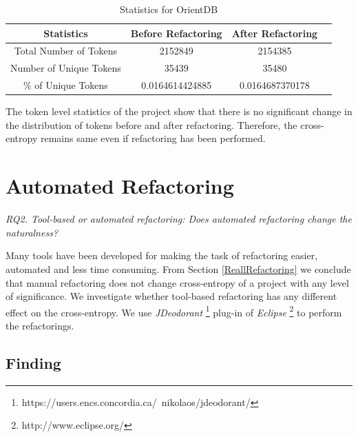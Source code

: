 \documentclass[conference]{IEEEtran}
\begin{document}
\begin{table}[t]
\centering
\caption{Statistics for OrientDB}
\label{SuammaryOrientDB}
 \begin{tabular}{||c c c c||} 
 \hline
 Statistics & Before Refactoring & After Refactoring \\ [0.5ex] 
 \hline\hline
 Total Number of Tokens & 2152849 & 2154385 \\ 
 \hline
   Number of Unique Tokens & 35439 & 35480 \\
 \hline
	\% of Unique Tokens  & 0.0164614424885 & 0.0164687370178  \\ [1ex]  
 \hline
\end{tabular}
\end{table}

The token level statistics of the project show that there is no significant change in the distribution of tokens before and after refactoring. Therefore, the cross-entropy remains same even if refactoring has been performed.

\noindent{}

\section{Automated Refactoring} \label{ToolRefactoring}
\textit{RQ2. Tool-based or automated refactoring: Does automated refactoring change the naturalness?}

Many tools have been developed for making the task of refactoring easier, automated and less time consuming. From Section \ref{ReallRefactoring}  we conclude that manual refactoring does not change cross-entropy of a project with any level of significance. We investigate whether tool-based refactoring has any different effect on the cross-entropy. We use \textit{JDeodorant} \footnote{https://users.encs.concordia.ca/~nikolaos/jdeodorant/} plug-in of \textit{Eclipse} \footnote{http://www.eclipse.org/} to perform the refactorings.
\subsection{Finding}
\end{document}
